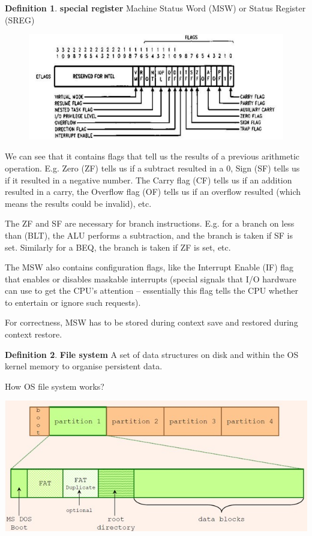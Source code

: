 \documentclass[12pt,a4paper]{article}
\theoremstyle{definition}
\newtheorem{definition}{Definition}[section]
\begin{document}
\begin{definition}{\textbf{special register} Machine Status Word (MSW) or Status Register (SREG)}
\begin{figure}[!h]
	\includegraphics[scale=0.2]{m1/machineStatusWord}
	\centering
\end{figure}

	We can see that it contains flags that tell us the results of a previous arithmetic operation. E.g. Zero (ZF) tells us if a subtract resulted in a 0, Sign (SF) tells us if it resulted in a negative number. The Carry flag (CF) tells us if an addition resulted in a carry, the Overflow flag (OF) tells us if an overflow resulted (which means the results could be invalid), etc.
	
	The ZF and SF are necessary for branch instructions. E.g. for a branch on less than (BLT), the ALU performs a subtraction, and the branch is taken if SF is set. Similarly for a BEQ, the branch is taken if ZF is set, etc.
	
	The MSW also contains configuration flags, like the Interrupt Enable (IF) flag that enables or disables maskable interrupts (special signals that I/O hardware can use to get the CPU's attention – essentially this flag tells the CPU whether to entertain or ignore such requests).
	
	For correctness, MSW has to be stored during context save and restored during context restore.
\end{definition}

\begin{definition}{\textbf{File system}}
	A set of data structures on disk and within the OS kernel memory to organise persistent data.
\end{definition}

\begin{tcolorbox}
\textsf{How OS file system works?}

	\includegraphics[scale=0.3]{m1/fileSystem}
	\centering
\end{tcolorbox}
\end{document}
